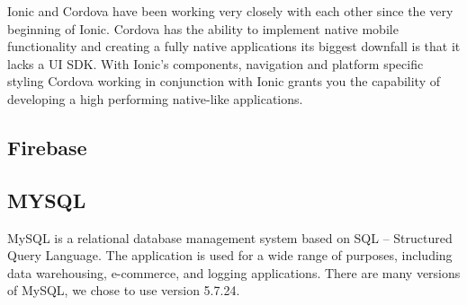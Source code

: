 \documentclass[a4paper,12pt,twoside]{report}
\begin{document}
Ionic and Cordova have been working very closely with each other since the very beginning of Ionic. Cordova has the ability to implement native mobile functionality and creating a fully native applications its biggest downfall is that it lacks a UI SDK.
With Ionic's components, navigation and platform specific styling Cordova working in conjunction with Ionic grants you the capability of developing a high performing native-like applications.\cite{cordovaInsight}

\subsection{Firebase}

\subsection{MYSQL}
MySQL is a relational database management system based on SQL – Structured Query Language. The application is used for a wide range of purposes, including data warehousing, e-commerce, and logging applications. There are many versions of MySQL, we chose to use version 5.7.24.
\end{document}
